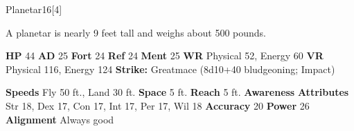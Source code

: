   \begin{monsubsection}{Planetar}{16}[4]
    \vspace{-1em}\vspace{-1em}
    \vspace{0em}

    
          A planetar is nearly 9 feet tall and weighs about 500 pounds.
        

    \begin{spellcontent}
      \begin{spelltargetinginfo}
        \pari \textbf{HP} 44 \monsep
          \textbf{AD} 25 \monsep
          \textbf{Fort} 24 \monsep
          \textbf{Ref} 24 \monsep
          \textbf{Ment} 25
        \pari \textbf{WR} Physical 52, Energy 60 \monsep
        \textbf{VR} Physical 116, Energy 124
        \pari \textbf{Strike:}
            Greatmace  (8d10+40 bludgeoning; Impact)
      \end{spelltargetinginfo}
    \end{spellcontent}
    \begin{monsterfooter}
      \pari \textbf{Speeds} Fly 50 ft., Land 30 ft. \monsep
        \textbf{Space} 5 ft. \monsep
        \textbf{Reach} 5 ft.
      \pari \textbf{Awareness} 
      \pari \textbf{Attributes}
        Str 18, Dex 17,
        Con 17, Int 17,
        Per 17, Wil 18
      \pari \textbf{Accuracy} 20 \monsep
        \textbf{Power} 26
      \pari \textbf{Alignment} Always good
    \end{monsterfooter}
  \end{monsubsection}
  
  

